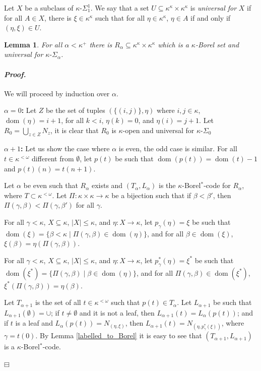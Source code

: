 \documentclass[12pt,a4paper]{amsart}
\newtheorem{lemma}[thm]{Lemma}
\theoremstyle{definition}
\theoremstyle{remark}
\DeclareMathOperator{\dom}{dom}
\renewcommand{\mid}{\mathrel{|}\allowbreak}
\newenvironment{cproof}{\paragraph{\emph{Proof.\,}}}{\hfill{$\boxminus$}\par\vspace{2mm}}
\def\borelstar{Borel\nobreak\hspace{1pt}$^*$}
\begin{document}
Let $X$ be a subclass of $\kappa$-$\Sigma^1_1$. We say that a set $U\subseteq\kappa^\kappa\times\kappa^\kappa$ is \emph{universal for} $X$ if for all $A\in X$, there is $\xi\in \kappa^\kappa$ such that for all $\eta\in\kappa^\kappa$, $\eta\in A$ if and only if $(\eta,\xi)\in U$.

\begin{lemma}
    For all $\alpha<\kappa^+$ there is $R_\alpha\subseteq \kappa^\kappa\times\kappa^\kappa$ which is a $\kappa$-Borel set and universal for $\kappa\text{-}\Sigma_{\alpha}$.
\end{lemma}

\begin{cproof}
    We will proceed by induction over $\alpha$. 

    {\bf $\alpha=0$:} Let $Z$ be the set of tuples $(\{(i,j)\},\eta)$ where $i,j\in \kappa$, $\dom(\eta)=i+1$, for all $k<i$, $\eta(k)=0$, and $\eta(i)=j+1$. Let $R_0=\bigcup_{z\in Z}N_z$, it is clear that $R_0$ is $\kappa$-open and universal for $\kappa\text{-}\Sigma_{0}$

    {\bf $\alpha+1$:} Let us show the case where $\alpha$ is even, the odd case is similar. For all $t\in \kappa^{<\omega}$ different from $\emptyset$, let $p(t)$ be such that $\dom(p(t))=\dom(t)-1$ and $p(t)(n)=t(n+1)$. 

    Let $\alpha$ be even such that $R_\alpha$ exists and $(T_\alpha,L_\alpha)$ is the $\kappa$-\borelstar-code for $R_\alpha$, where $T\subset \kappa^{<\omega}$. Let $\Pi:\kappa\times\kappa\rightarrow\kappa$ be a bijection such that if $\beta<\beta'$, then $\Pi(\gamma,\beta)<\Pi(\gamma,\beta')$ for all $\gamma$. 
    
    For all $\gamma<\kappa$, $X\subseteq \kappa$, $|X|\leq\kappa$, and $\eta:X\rightarrow\kappa$, let $p_\gamma(\eta)=\xi$ be such that $\dom(\xi)=\{\beta<\kappa\mid \Pi(\gamma,\beta)\in \dom (\eta)\}$, and for all $\beta\in \dom (\xi)$, $\xi(\beta)=\eta(\Pi(\gamma,\beta))$.

    For all $\gamma<\kappa$, $X\subseteq \kappa$, $|X|\leq\kappa$, and $\eta:X\rightarrow\kappa$, let $p^*_\gamma(\eta)=\xi^*$ be such that $\dom(\xi^*)=\{\Pi(\gamma,\beta)\mid \beta\in \dom (\eta)\}$, and for all $\Pi(\gamma,\beta)\in \dom (\xi^*)$, $\xi^*(\Pi(\gamma,\beta))=\eta(\beta)$.
    
    Let $T_{\alpha+1}$ is the set of all $t\in \kappa^{<\omega}$ such that $p(t)\in T_\alpha$. Let $L_{\alpha+1}$ be such that $L_{\alpha+1}(\emptyset)=\cup$; if $t\neq\emptyset$ and it is not a leaf, then $L_{\alpha+1}(t)=L_\alpha(p(t))$; and if $t$ is a leaf and $L_\alpha(p(t))=N_{(\eta,\xi)}$, then $L_{\alpha+1}(t)=N_{(\eta,p^*_\gamma(\xi))}$, where $\gamma=t(0)$. By Lemma \ref{labelled_to_Borel} it is easy to see that $(T_{\alpha+1},L_{\alpha+1})$ is a $\kappa$-\borelstar-code.
    

\end{cproof}
\end{document}
